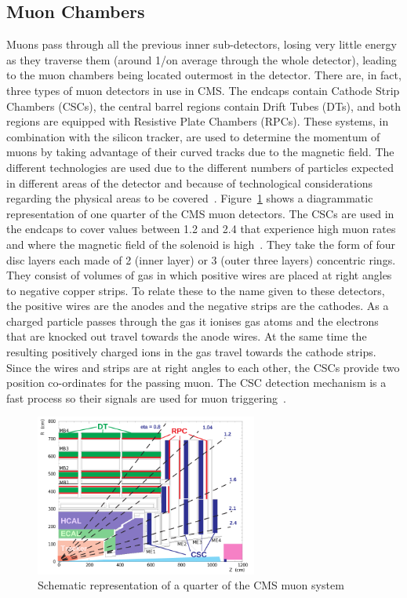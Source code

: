 \subsection{Muon Chambers}
\label{ss:Muon_Chambers}
Muons pass through all the previous inner sub-detectors, losing very little energy as they traverse them
(around 1\MeV/\mm on average through the whole detector), leading to the muon chambers being located outermost
in the detector. There are, in fact, three types of muon detectors in use in CMS. The endcaps contain Cathode
Strip Chambers (CSCs), the central barrel regions contain Drift Tubes (DTs), and both regions are equipped
with Resistive Plate Chambers (RPCs). These systems, in combination with the silicon tracker, are used to
determine the momentum of muons by taking advantage of their curved tracks due to the magnetic field. The
different technologies are used due to the different numbers of particles expected in different areas of the
detector and because of technological considerations regarding the physical areas to be
covered~\cite{CMS_TDR1}. Figure~\ref{fig:CMS_muon_system} shows a diagrammatic representation of one quarter
of the CMS muon detectors. The CSCs are used in the endcaps to cover \abseta values between 1.2 and 2.4 that
experience high muon rates and where the magnetic field of the solenoid is high~\cite{CMS_TDR1}. They take the
form of four disc layers each made of 2 (inner layer) or 3 (outer three layers) concentric rings. They consist
of volumes of gas in which positive wires are placed at right angles to negative copper strips. To relate
these to the name given to these detectors, the positive wires are the anodes and the negative strips are the
cathodes. As a charged particle passes through the gas it ionises gas atoms and the electrons that are knocked
out travel towards the anode wires. At the same time the resulting positively charged ions in the gas travel
towards the cathode strips. Since the wires and strips are at right angles to each other, the CSCs provide two
position co-ordinates for the passing muon. The CSC detection mechanism is a fast process so their signals are
used for muon triggering~\cite{CMS_experiment}.
 
\begin{figure}[hbtp]
   \centering
     \includegraphics[width=0.65\textwidth]{Chapters/02_Detector/Images/MuonSys-mod3.png}\hfill
     \caption[Schematic representation of a quarter of the CMS muon system.]{Schematic representation of a
     quarter of the CMS muon system \cite{Muon_tracking}}
     \label{fig:CMS_muon_system}
\end{figure}

